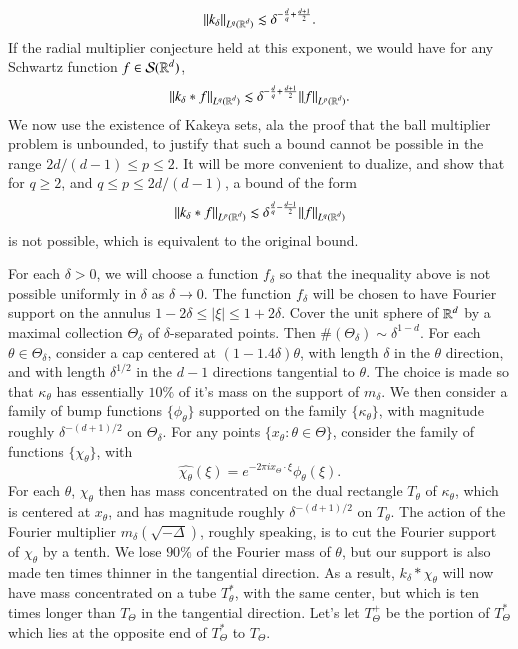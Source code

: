 %
\[ \| k_\delta \|_{L^q(\operatorname{\mathbb{R}}^d)} \lesssim \delta^{- \frac{d}{q} + \frac{d+1}{2}}. \]
%
If the radial multiplier conjecture held at this exponent, we would have for any Schwartz function $f \in \mathcal{S}(\operatorname{\mathbb{R}}^d)$,
%
\[ \| k_\delta * f \|_{L^q(\operatorname{\mathbb{R}}^d)} \lesssim \delta^{ - \frac{d}{q} + \frac{d+1}{2}} \| f \|_{L^p(\operatorname{\mathbb{R}}^d)}. \]
%
We now use the existence of Kakeya sets, ala the proof that the ball multiplier problem is unbounded, to justify that such a bound cannot be possible in the range $2d/(d-1) \leq p \leq 2$. It will be more convenient to dualize, and show that for $q \geq 2$, and $q \leq p \leq 2d/(d-1)$, a bound of the form
%
\[ \| k_\delta * f \|_{L^p(\operatorname{\mathbb{R}}^d)} \lesssim \delta^{ \frac{d}{q} - \frac{d-1}{2} } \| f \|_{L^q(\operatorname{\mathbb{R}}^d)} \]
%
is not possible, which is equivalent to the original bound.

For each $\delta > 0$, we will choose a function $f_\delta$ so that the inequality above is not possible uniformly in $\delta$ as $\delta \to 0$. The function $f_\delta$ will be chosen to have Fourier support on the annulus $1 - 2 \delta \leq |\xi| \leq 1 + 2 \delta$. Cover the unit sphere of $\operatorname{\mathbb{R}}^d$ by a maximal collection $\Theta_\delta$ of $\delta$-separated points. Then $\#(\Theta_\delta) \sim \delta^{1-d}$. For each $\theta \in \Theta_\delta$, consider a cap centered at $(1 - 1.4\delta) \theta$, with length $\delta$ in the $\theta$ direction, and with length $\delta^{1/2}$ in the $d-1$ directions tangential to $\theta$. The choice is made so that $\kappa_\theta$ has essentially $10\%$ of it's mass on the support of $m_\delta$. We then consider a family of bump functions $\{ \phi_\theta \}$ supported on the family $\{ \kappa_\theta \}$, with magnitude roughly $\delta^{-(d+1)/2}$ on $\Theta_\delta$. For any points $\{ x_\theta : \theta \in \Theta \}$, consider the family of functions $\{ \chi_\theta \}$, with
%
\[ \widehat{\chi_\theta}(\xi) = e^{- 2 \pi i x_\Theta \cdot \xi} \phi_\theta(\xi). \]
%
For each $\theta$, $\chi_\theta$ then has mass concentrated on the dual rectangle $T_\theta$ of $\kappa_\theta$, which is centered at $x_\theta$, and has magnitude roughly $\delta^{-(d+1)/2}$ on $T_\theta$. The action of the Fourier multiplier $m_\delta(\sqrt{-\Delta})$, roughly speaking, is to cut the Fourier support of $\chi_\theta$ by a tenth. We lose $90 \%$ of the Fourier mass of $\theta$, but our support is also made ten times thinner in the tangential direction. As a result, $k_\delta * \chi_\theta$ will now have mass concentrated on a tube $T_\theta^*$, with the same center, but which is ten times longer than $T_\Theta$ in the tangential direction. Let's let $T_\Theta^+$ be the portion of $T_\Theta^*$ which lies at the opposite end of $T_\Theta^*$ to $T_\Theta$.

